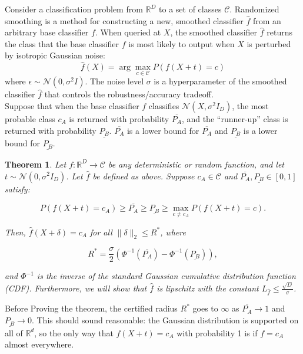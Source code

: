 \documentclass{article}
\theoremstyle{plain}
\newtheorem{theorem}{Theorem}[section]
\theoremstyle{definition}
\theoremstyle{remark}
\begin{document}
Consider a classification problem from \( \mathbb{R}^D \) to a set of classes \( \mathcal{C} \). 
Randomized smoothing is a method for constructing a new, smoothed classifier \( \hat{f} \) from an arbitrary base classifier \( f \). When queried at \( X \), the smoothed classifier \( \hat{f} \) returns the class that the base classifier \( f \) is most likely to output when \( X \) is perturbed by isotropic Gaussian noise:
\[
\hat{f}(X) = \arg\max_{c \in \mathcal{C}} P(f(X + t) = c)
\]
where \( \epsilon \sim \mathcal{N}(0, \sigma^2 I) \).
The noise level \( \sigma \) is a hyperparameter of the smoothed classifier \( \hat{f} \) 
that controls the robustness/accuracy tradeoff.
\\
Suppose that when the base classifier \( f \) classifies \( \mathcal{N}(X, \sigma^2I_D) \), the most probable class \( c_A \) is returned with probability \( \overline{P_A} \), and the “runner-up” class is returned with probability \( \underline{P_B} \). \( \overline{P_A} \) is a lower bound for \( \overline{P_A} \) and \( \underline{P_B} \) is a lower bound for \( \underline{P_B} \).
\\
\begin{theorem}
Let \( f : \mathbb{R}^D \to \mathcal{C} \) be any deterministic or random function, and let \( t \sim \mathcal{N}(0, \sigma^2 I_D) \). 
Let \( \hat{f} \) be defined as above. Suppose \( c_A \in \mathcal{C} \) and \( \overline{P_A}, \underline{P_B} \in [0, 1] \) satisfy:

\[
P(f(X + t) = c_A) \geq \overline{P_A} \geq \underline{P_B} \geq \max_{c \neq c_A} P(f(X + t) = c).
\]

Then, \( \hat{f}(X + \delta) = c_A \) for all \( \| \delta \|_2 \leq R^* \), where

\[
R^* = \frac{\sigma}{2} \left( \Phi^{-1}(\overline{P_A}) - \Phi^{-1}(\underline{P_B}) \right),
\]

and \( \Phi^{-1} \) is the inverse of the standard Gaussian cumulative distribution function (CDF). Furthermore, we will show that $\hat{f}$ is lipschitz with the constant $L_{\hat{f}} \leq \frac{\sqrt{D}}{\sigma}$.

\end{theorem}
Before Proving the theorem, the certified radius \( R^* \) goes to \( \infty \) as \( \overline{P_A} \to 1 \) and \( \underline{P_B} \to 0 \). This should sound reasonable: the Gaussian distribution is supported on all of \( \mathbb{R}^d \), so the only way that \( f(X + t) = c_A \) with probability 1 is if \( f = c_A \) almost everywhere. 
\end{document}
